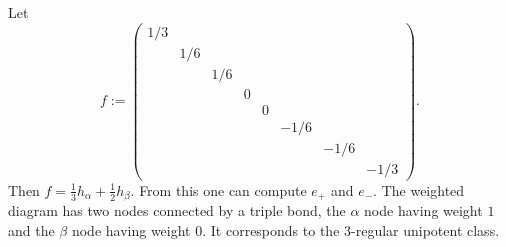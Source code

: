 \documentclass[12pt,letterpaper]{amsart}
\begin{document}
Let
\[
f:= \begin{pmatrix} 1/3&&&&&&& \\
&1/6&&&&&& \\
&&1/6&&&&& \\
&&&0&&&& \\
&&&&0&&& \\
&&&&&-1/6&& \\
&&&&&&-1/6& \\
&&&&&&&-1/3
\end{pmatrix}.
\]
Then $f=\frac{1}{3}h_\alpha +\frac{1}{2}h_\beta$. From this one can compute
$e_+$ and $e_-$. The weighted diagram has two nodes connected by
a triple bond, the $\alpha$ node having weight $1$ and the
$\beta$ node having weight $0$. It corresponds to the 3-regular unipotent
class.
\fi
\end{document}
